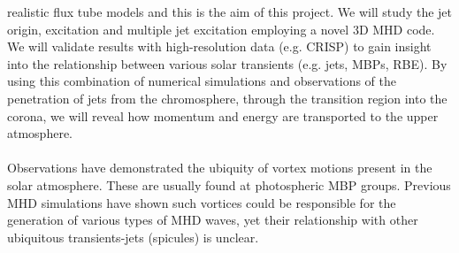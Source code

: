 \documentclass[12pt,a4paper,twoside]{article}
\begin{document}
realistic flux tube models and this is the aim of this project. We will study the jet origin, excitation and multiple jet excitation employing a novel 3D MHD code. We will validate results with high-resolution data (e.g. CRISP) to gain insight into the relationship between various solar transients (e.g. jets, MBPs, RBE). By using this combination of numerical simulations and observations of the penetration of jets from the chromosphere, through the transition region into the corona, we will reveal how momentum and energy are transported to the upper atmosphere. \\ \\
Observations have demonstrated the ubiquity of vortex motions present in the solar atmosphere. These are usually found at photospheric MBP groups. Previous MHD simulations have shown such vortices could be responsible for the generation of various types of MHD waves, yet their relationship with other ubiquitous transients-jets (spicules) is unclear.
\end{document}
